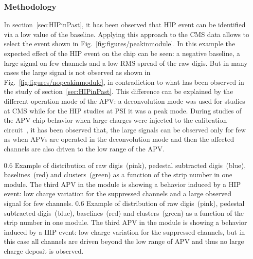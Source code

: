 


 \subsubsection{Methodology}
 

In section~\ref{sec:HIPinPast}, it has been observed that HIP event can be identified via a low value of the baseline. Applying this approach to the CMS data allows to select the event shown in Fig.~\ref{fig:figures/peakinmodule}. In this example the expected effect of the HIP event on the chip can be seen: a negative baseline, a large signal on few channels and a low RMS spread of the raw digis. But in many cases the large signal is not observed as shown in Fig.~\ref{fig:figures/nopeakinmodule}, in contradiction to what has been observed in the study of section~\ref{sec:HIPinPast}. This difference can be explained by the different operation mode of the APV: a deconvolution mode was used for studies at CMS while for the HIP studies at PSI it was a peak mode. During studies of the APV chip behavior when large charges were injected to the calibration circuit~\cite{Bainbridge:2002bda}, it has been observed that, the large signals can be observed only for few ns when APVs are operated in the deconvolution mode and then the affected channels are also driven to the low range of the APV. 

                 {0.6}       %
                 {Example of distribution of raw digis~(pink), pedestal subtracted digis~(blue), baselines~(red) and clusters~(green) as a function of the strip number in one module. The third APV in the module is showing a behavior induced by a HIP event: low charge variation for the suppressed channels and a large observed signal for few channels. } %
                 {0.6}       %
                 {Example of distribution of raw digis~(pink), pedestal subtracted digis~(blue), baselines~(red) and clusters~(green) as a function of the strip number in one module. The third APV in the module is showing a behavior induced by a HIP event: low charge variation for the suppressed channels, but in this case all channels are driven beyond the low range of APV and thus no large charge deposit is observed. } %

